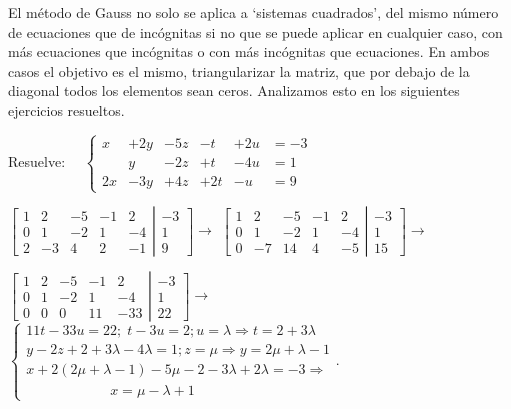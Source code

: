 El método de Gauss no solo se aplica a `sistemas cuadrados', del mismo número de ecuaciones que de incógnitas si no que se puede aplicar en cualquier caso, con más ecuaciones que incógnitas o con más incógnitas que ecuaciones. En ambos casos el objetivo es el mismo, triangularizar la matriz, que por debajo de la diagonal todos los elementos sean ceros. Analizamos esto en los  siguientes ejercicios resueltos.
\begin{ejre} 
Resuelve: $\quad \left\{ \begin{matrix}
x&+2y&-5z&-t&+2u&=-3\\
&y&-2z&+t&-4u&=1\\
2x&-3y&+4z&+2t&-u&=9	
\end{matrix} \right.$
	
\end{ejre}
\begin{proofw}\renewcommand{\qedsymbol}{$\diamond$}

$\left[ \begin{matrix}
  1 & 2 & -5 & -1 & 2 \\ 0 & 1 & -2 & 1 & -4 \\ 2 & -3 & 4 & 2 & -1  
 \end{matrix}\right. 
 \left| \begin{matrix}
  -3 \\ 1 \\ 9 
 \end{matrix}\right] \to  $
$\left[ \begin{matrix}
  1 & 2 & -5 & -1 & 2 \\ 0 & 1 & -2 & 1 & -4 \\ 0 & -7 & 14 & 4 & -5  
 \end{matrix}\right. 
 \left| \begin{matrix}
  -3 \\ 1 \\ 15 
 \end{matrix}\right] \to  $
 
 \noindent \footnotesize{$\left[ \begin{matrix}
  1 & 2 & -5 & -1 & 2 \\ 0 & 1 & -2 & 1 & -4 \\ 0 & 0 & 0 & 11 & -33  
 \end{matrix}\right. 
 \left| \begin{matrix}
  -3 \\ 1 \\ 22 
 \end{matrix}\right] \to$}
 \scriptsize{$  \begin{cases}
  11t-33u=22; \; t-3u=2; u=\lambda \Rightarrow t=2+3\lambda \\
  y-2z+2+3\lambda-4\lambda=1; z=\mu \Rightarrow y=2\mu +\lambda -1\\
  x+2(2\mu+\lambda-1)-5\mu-2-3\lambda+2	\lambda=-3 \Rightarrow \\ \qquad  \qquad \qquad x=\mu-\lambda+1 \end{cases}$}\normalsize{.}




\end{proofw}
